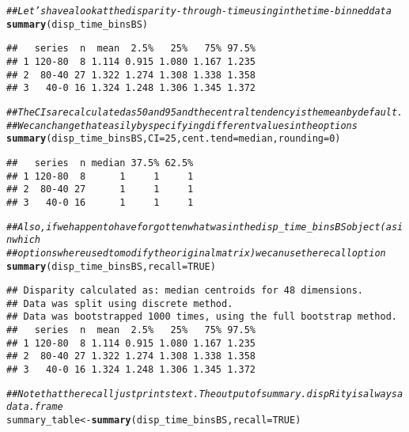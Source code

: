 \documentclass{article}\usepackage[]{graphicx}\usepackage[]{color}
\makeatletter
\newcommand{\hlnum}[1]{\textcolor[rgb]{0.686,0.059,0.569}{#1}}%
\newcommand{\hlcom}[1]{\textcolor[rgb]{0.678,0.584,0.686}{\textit{#1}}}%
\newcommand{\hlstd}[1]{\textcolor[rgb]{0.345,0.345,0.345}{#1}}%
\newcommand{\hlkwb}[1]{\textcolor[rgb]{0.69,0.353,0.396}{#1}}%
\newcommand{\hlkwc}[1]{\textcolor[rgb]{0.333,0.667,0.333}{#1}}%
\newcommand{\hlkwd}[1]{\textcolor[rgb]{0.737,0.353,0.396}{\textbf{#1}}}%
\newenvironment{kframe}{%
 \def\at@end@of@kframe{}%
 \ifinner\ifhmode%
  \def\at@end@of@kframe{\end{minipage}}%
  \begin{minipage}{\columnwidth}%
 \fi\fi%
 \def\FrameCommand##1{\hskip\@totalleftmargin \hskip-\fboxsep
 \colorbox{shadecolor}{##1}\hskip-\fboxsep
     \hskip-\linewidth \hskip-\@totalleftmargin \hskip\columnwidth}%
 \MakeFramed {\advance\hsize-\width
   \@totalleftmargin\z@ \linewidth\hsize
   \@setminipage}}%
 {\par\unskip\endMakeFramed%
 \at@end@of@kframe}
\newenvironment{knitrout}{}{} %
\makeatother
\begin{document}
\begin{knitrout}
\color{fgcolor}\begin{kframe}
\begin{alltt}
\hlcom{## Let's have a look at the disparity-through-time using in the time-binned data}
\hlkwd{summary}\hlstd{(disp_time_binsBS)}
\end{alltt}
\begin{verbatim}
##   series  n  mean  2.5%   25%   75% 97.5%
## 1 120-80  8 1.114 0.915 1.080 1.167 1.235
## 2  80-40 27 1.322 1.274 1.308 1.338 1.358
## 3   40-0 16 1.324 1.248 1.306 1.345 1.372
\end{verbatim}
\begin{alltt}
\hlcom{## The CIs are calculated as 50 and 95 and the central tendency is the mean by default.}
\hlcom{## We can change that easily by specifying different values in the options}
\hlkwd{summary}\hlstd{(disp_time_binsBS,} \hlkwc{CI} \hlstd{=} \hlnum{25}\hlstd{,} \hlkwc{cent.tend} \hlstd{= median,} \hlkwc{rounding} \hlstd{=} \hlnum{0}\hlstd{)}
\end{alltt}
\begin{verbatim}
##   series  n median 37.5% 62.5%
## 1 120-80  8      1     1     1
## 2  80-40 27      1     1     1
## 3   40-0 16      1     1     1
\end{verbatim}
\begin{alltt}
\hlcom{## Also, if we happen to have forgotten what was in the disp_time_binsBS object (as in which}
\hlcom{## options where used to modify the original matrix) we can use the recall option}
\hlkwd{summary}\hlstd{(disp_time_binsBS,} \hlkwc{recall} \hlstd{=} \hlnum{TRUE}\hlstd{)}
\end{alltt}
\begin{verbatim}
## Disparity calculated as: median centroids for 48 dimensions.
## Data was split using discrete method.
## Data was bootstrapped 1000 times, using the full bootstrap method.
##   series  n  mean  2.5%   25%   75% 97.5%
## 1 120-80  8 1.114 0.915 1.080 1.167 1.235
## 2  80-40 27 1.322 1.274 1.308 1.338 1.358
## 3   40-0 16 1.324 1.248 1.306 1.345 1.372
\end{verbatim}
\begin{alltt}
\hlcom{## Note that the recall just prints text. The output of summary.dispRity is always a data.frame}
\hlstd{summary_table} \hlkwb{<-} \hlkwd{summary}\hlstd{(disp_time_binsBS,} \hlkwc{recall} \hlstd{=} \hlnum{TRUE}\hlstd{)}
\end{alltt}
\begin{verbatim}

\end{verbatim}
\end{kframe}
\end{knitrout}
\end{document}
